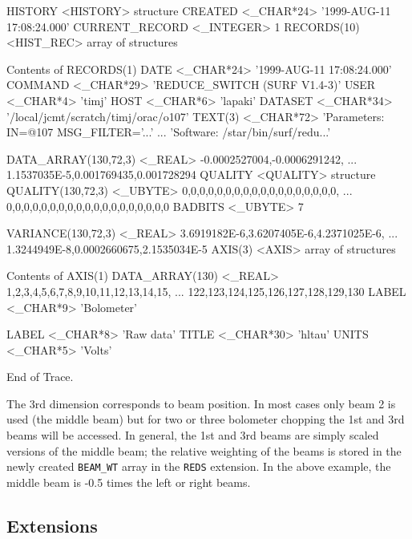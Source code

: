 \documentclass[twoside,11pt,nolof]{starlink}
\begin{document}
\begin{small}
\begin{terminalv}
   HISTORY        <HISTORY>       {structure}
      CREATED        <_CHAR*24>      '1999-AUG-11 17:08:24.000'
      CURRENT_RECORD  <_INTEGER>     1
      RECORDS(10)    <HIST_REC>      {array of structures}

      Contents of RECORDS(1)
         DATE           <_CHAR*24>      '1999-AUG-11 17:08:24.000'
         COMMAND        <_CHAR*29>      'REDUCE_SWITCH   (SURF V1.4-3)'
         USER           <_CHAR*4>       'timj'
         HOST           <_CHAR*6>       'lapaki'
         DATASET        <_CHAR*34>      '/local/jcmt/scratch/timj/orac/o107'
         TEXT(3)        <_CHAR*72>      'Parameters: IN=@107 MSG_FILTER='...'
                                        ... 'Software: /star/bin/surf/redu...'

   DATA_ARRAY(130,72,3)  <_REAL>   -0.0002527004,-0.0006291242,
                                   ... 1.1537035E-5,0.001769435,0.001728294
   QUALITY        <QUALITY>       {structure}
      QUALITY(130,72,3)  <_UBYTE>    0,0,0,0,0,0,0,0,0,0,0,0,0,0,0,0,0,0,
                                     ... 0,0,0,0,0,0,0,0,0,0,0,0,0,0,0,0,0,0,0
      BADBITS        <_UBYTE>        7

   VARIANCE(130,72,3)  <_REAL>    3.6919182E-6,3.6207405E-6,4.2371025E-6,
                                  ... 1.3244949E-8,0.0002660675,2.1535034E-5
   AXIS(3)        <AXIS>          {array of structures}

   Contents of AXIS(1)
      DATA_ARRAY(130)  <_REAL>       1,2,3,4,5,6,7,8,9,10,11,12,13,14,15,
                                     ... 122,123,124,125,126,127,128,129,130
      LABEL          <_CHAR*9>       'Bolometer'

   LABEL          <_CHAR*8>       'Raw data'
   TITLE          <_CHAR*30>      'hltau'
   UNITS          <_CHAR*5>       'Volts'

End of Trace.
\end{terminalv}
\end{small}

The 3rd dimension corresponds to beam position. In most cases only beam 2 is
used (the middle beam) but for two or three  bolometer chopping the 1st and
3rd beams will be accessed. In general, the 1st and 3rd beams are simply
scaled versions of the middle beam; the relative weighting of the beams is
stored in the newly created \texttt{BEAM\_WT} array in the \texttt{REDS}
extension. In the above example, the middle beam is -0.5 times the left or
right beams.



\subsection{Extensions\label{scu:ext}}
\end{document}
